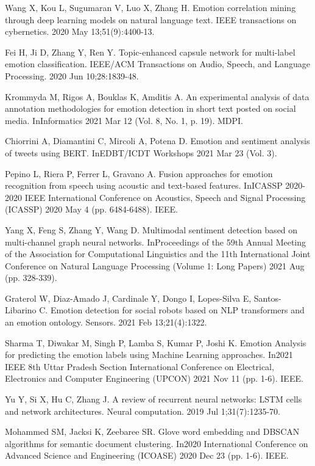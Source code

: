\documentclass[12pt,notitlepage,oneside]{report}
\begin{document}
\begin{thebibliography}{8}
Wang X, Kou L, Sugumaran V, Luo X, Zhang H. Emotion correlation mining through deep learning models on natural language text. IEEE transactions on cybernetics. 2020 May 13;51(9):4400-13.

Fei H, Ji D, Zhang Y, Ren Y. Topic-enhanced capsule network for multi-label emotion classification. IEEE/ACM Transactions on Audio, Speech, and Language Processing. 2020 Jun 10;28:1839-48.

Krommyda M, Rigos A, Bouklas K, Amditis A. An experimental analysis of data annotation methodologies for emotion detection in short text posted on social media. InInformatics 2021 Mar 12 (Vol. 8, No. 1, p. 19). MDPI.

Chiorrini A, Diamantini C, Mircoli A, Potena D. Emotion and sentiment analysis of tweets using BERT. InEDBT/ICDT Workshops 2021 Mar 23 (Vol. 3).

Pepino L, Riera P, Ferrer L, Gravano A. Fusion approaches for emotion recognition from speech using acoustic and text-based features. InICASSP 2020-2020 IEEE International Conference on Acoustics, Speech and Signal Processing (ICASSP) 2020 May 4 (pp. 6484-6488). IEEE.

Yang X, Feng S, Zhang Y, Wang D. Multimodal sentiment detection based on multi-channel graph neural networks. InProceedings of the 59th Annual Meeting of the Association for Computational Linguistics and the 11th International Joint Conference on Natural Language Processing (Volume 1: Long Papers) 2021 Aug (pp. 328-339).

Graterol W, Diaz-Amado J, Cardinale Y, Dongo I, Lopes-Silva E, Santos-Libarino C. Emotion detection for social robots based on NLP transformers and an emotion ontology. Sensors. 2021 Feb 13;21(4):1322.

Sharma T, Diwakar M, Singh P, Lamba S, Kumar P, Joshi K. Emotion Analysis for predicting the emotion labels using Machine Learning approaches. In2021 IEEE 8th Uttar Pradesh Section International Conference on Electrical, Electronics and Computer Engineering (UPCON) 2021 Nov 11 (pp. 1-6). IEEE.

Yu Y, Si X, Hu C, Zhang J. A review of recurrent neural networks: LSTM cells and network architectures. Neural computation. 2019 Jul 1;31(7):1235-70.

Mohammed SM, Jacksi K, Zeebaree SR. Glove word embedding and DBSCAN algorithms for semantic document clustering. In2020 International Conference on Advanced Science and Engineering (ICOASE) 2020 Dec 23 (pp. 1-6). IEEE.


\end{thebibliography}
\end{document}
